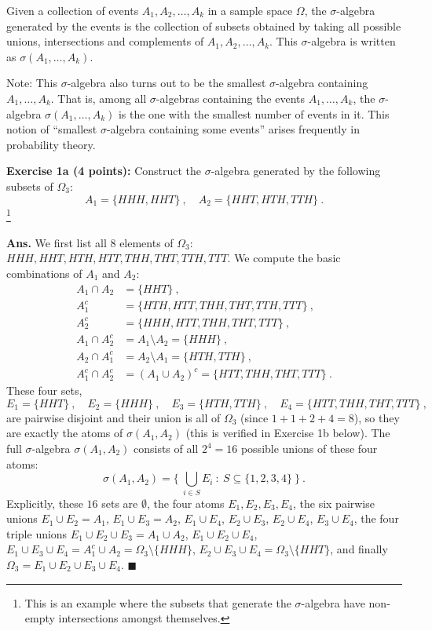 \documentclass[12pt]{article} %
\newcommand{\Ans}{\textbf{Ans. }}
\begin{document}
Given a collection of events $A_1, A_2, \ldots, A_k$ in a sample space
$\Omega$, the $\sigma$-algebra generated by the events is the
collection of subsets obtained by taking all possible unions,
intersections and complements of $A_1, A_2, \ldots, A_k$. This
$\sigma$-algebra is written as $\sigma(A_1, \ldots, A_k)$.

Note: This $\sigma$-algebra also turns out to be the smallest
$\sigma$-algebra containing $A_1, \ldots, A_k$. That is, among all
$\sigma$-algebras containing the events $A_1, \ldots, A_k$, the
$\sigma$-algebra $\sigma(A_1, \ldots, A_k)$ is the one with the
smallest number of events in it. This notion of ``smallest
$\sigma$-algebra containing some events'' arises frequently in
probability theory.

\textbf{Exercise 1a (4 points):} Construct the $\sigma$-algebra
generated by the following subsets of $\Omega_3$:
\begin{equation}
  A_1 = \{HHH, HHT\}\ ,\quad A_2 = \{HHT, HTH, TTH\}\ .
\end{equation}
\footnote{This is an example where the subsets that generate the
  $\sigma$-algebra have non-empty intersections amongst themselves.}

\Ans We first list all $8$ elements of $\Omega_3$:
$HHH,HHT,HTH,HTT,THH,THT,TTH,TTT$. We compute the basic combinations
of $A_1$ and $A_2$:
\begin{align}
  A_1 \cap A_2 &= \{HHT\}\ , \\
  A_1^c &= \{HTH,HTT,THH,THT,TTH,TTT\}\ ,\\
  A_2^c &= \{HHH,HTT,THH,THT,TTT\}\ ,\\
  A_1 \cap A_2^c &= A_1 \setminus A_2 = \{HHH\}\ ,\\
  A_2 \cap A_1^c &= A_2 \setminus A_1 = \{HTH,TTH\}\ ,\\
  A_1^c \cap A_2^c &= (A_1 \cup A_2)^c = \{HTT,THH,THT,TTT\}\ .
\end{align}
These four sets,
\begin{equation}
  E_1 = \{HHT\}\ ,\quad E_2 = \{HHH\}\ ,\quad E_3 = \{HTH,TTH\}\ ,\quad E_4 = \{HTT,THH,THT,TTT\}\ ,
\end{equation}
are pairwise disjoint and their union is all of $\Omega_3$ (since
$1+1+2+4 = 8$), so they are exactly the atoms of $\sigma(A_1,A_2)$
(this is verified in Exercise 1b below). The full $\sigma$-algebra
$\sigma(A_1,A_2)$ consists of all $2^4 = 16$ possible unions of these
four atoms:
\begin{equation}
  \sigma(A_1,A_2) = \{\ \textstyle\bigcup_{i \in S} E_i \ :\ S \subseteq \{1,2,3,4\}\ \}\ .
\end{equation}
Explicitly, these $16$ sets are $\emptyset$, the four atoms
$E_1,E_2,E_3,E_4$, the six pairwise unions $E_1 \cup E_2 = A_1$,
$E_1 \cup E_3 = A_2$, $E_1\cup E_4$, $E_2 \cup E_3$, $E_2 \cup E_4$,
$E_3 \cup E_4$, the four triple unions $E_1\cup E_2\cup E_3 = A_1\cup
A_2$, $E_1 \cup E_2 \cup E_4$, $E_1 \cup E_3 \cup E_4 = A_1^c \cup A_2
= \Omega_3 \setminus \{HHH\}$, $E_2 \cup E_3 \cup E_4 = \Omega_3
\setminus \{HHT\}$, and finally $\Omega_3 = E_1 \cup E_2 \cup E_3 \cup
E_4$. \hfill$\blacksquare$
\end{document}
